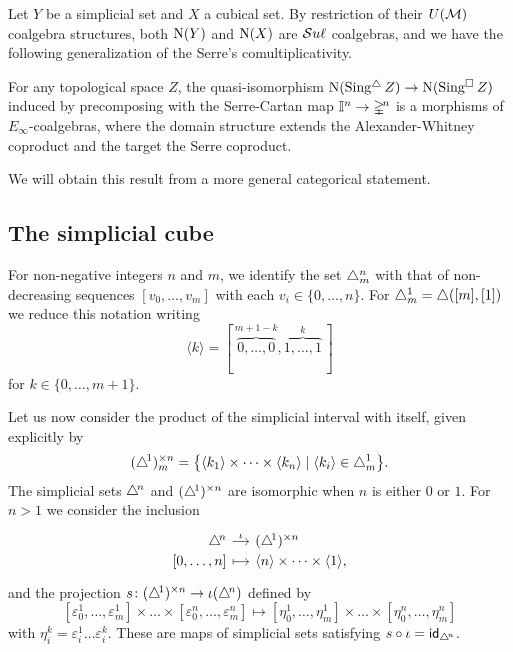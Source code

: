 Let $Y$ be a simplicial set and $X$ a cubical set.
By restriction of their $U(\mathcal{M})$ coalgebra structures, both $\operatorname{N}(Y)$ and $\operatorname{N}(X)$ are $\mathcal{S}u\ell$ coalgebras, and we have the following generalization of the Serre's comultiplicativity.

\begin{theorem} \label{t:extended comultiplicativity}
	For any topological space $Z$, the quasi-isomorphism $\operatorname{N}(\operatorname{Sing^{\triangle}} Z) \to \operatorname{N}(\operatorname{Sing^{\square}} Z)$ induced by precomposing with the Serre-Cartan map $\mathbb{I}^n \to \mathbb{\Delta}^{\!n}$ is a morphisms of $E_\infty$-coalgebras, where the domain structure extends the Alexander-Whitney coproduct and the target the Serre coproduct.
\end{theorem}

We will obtain this result from a more general categorical statement.

\subsection{The simplicial cube} \label{ss:the simplicial cube}

For non-negative integers $n$ and $m$, we identify the set $\triangle^n_m$ with that of non-decreasing sequences $[v_0, \dots, v_m]$ with each $v_i \in \{0, \dots, n\}$.
For $\triangle^1_m = \triangle([m], [1])$ we reduce this notation writing
\[
\langle k \rangle = [\, \overbrace{0, \dots, 0}^{m+1-k}, \overbrace{1, \dots, 1}^{k}\,]
\]
for $k \in \{0, \dots, m+1\}$.

Let us now consider the product of the simplicial interval with itself, given explicitly by
\[
(\triangle^{\!1})^{\times n}_m = \big\{ \langle k_1\rangle \times \dots \times \langle k_n\rangle \mid \langle k_i\rangle \in \triangle^1_m \big\}.
\]
The simplicial sets $\triangle^{\!n}$ and $(\triangle^{\!1})^{\times n}$ are isomorphic when $n$ is either $0$ or $1$.
For $n > 1$ we consider the inclusion
\[
\begin{tikzcd}[row sep=-3pt, column sep=small,
/tikz/column 1/.append style={anchor=base east},
/tikz/column 2/.append style={anchor=base west}]
\simplex^{\!n} \arrow[r, "\iota"] & \scube{n} \\
{[0, \dots, n]} \arrow[r, mapsto] & \angles{n} \times \dots \times \angles{1},
\end{tikzcd}
\]
and the projection $s \colon (\triangle^{\!1})^{\times n} \to \iota(\triangle^{\!n})$ defined by
\[
[ \varepsilon_0^1, \dots, \varepsilon_m^1] \times \dots \times [ \varepsilon_0^n, \dots, \varepsilon_m^n] \mapsto [ \eta_0^1, \dots, \eta_m^1] \times \dots \times [ \eta_0^n, \dots, \eta_m^n]
\]
with $\eta_i^k = \varepsilon_i^1 \dots \varepsilon_i^k$.
These are maps of simplicial sets satisfying $s \circ \iota = \mathsf{id}_{\triangle^{\!n}}$.

